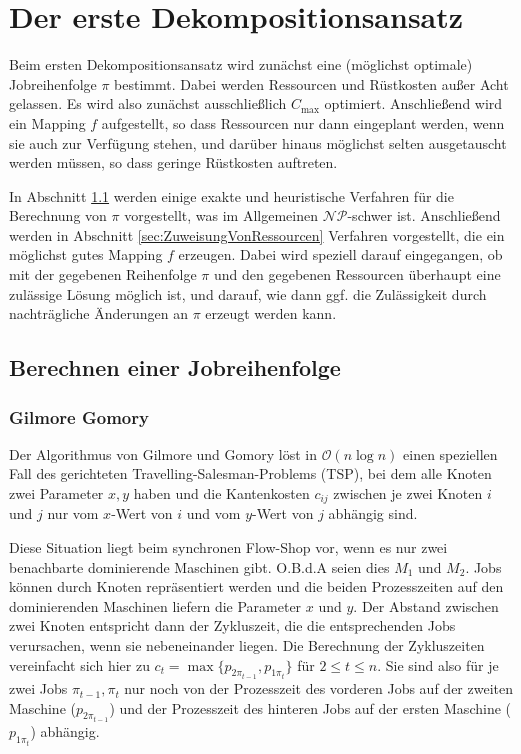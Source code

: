 \documentclass{scrreprt}
\begin{document}
\chapter{Der erste Dekompositionsansatz}
Beim ersten Dekompositionsansatz wird zunächst eine (möglichst optimale) Jobreihenfolge $\pi$ bestimmt.
Dabei werden Ressourcen und Rüstkosten außer Acht gelassen. 
Es wird also zunächst ausschließlich $C_{\max}$ optimiert. Anschließend wird ein Mapping $f$ aufgestellt,
so dass Ressourcen nur dann eingeplant werden, wenn sie auch zur Verfügung stehen, und darüber hinaus
möglichst selten ausgetauscht werden müssen, so dass geringe Rüstkosten auftreten.

In Abschnitt \ref{sec:BerechnenEinerJobreihenfolge} werden einige exakte und heuristische Verfahren für die
Berechnung von $\pi$ vorgestellt, was im Allgemeinen $\mathcal{NP}$-schwer ist.
Anschließend werden in Abschnitt \ref{sec:ZuweisungVonRessourcen} Verfahren vorgestellt, die ein möglichst gutes Mapping $f$ erzeugen.
Dabei wird speziell darauf eingegangen, ob mit der gegebenen Reihenfolge $\pi$ und den gegebenen Ressourcen
überhaupt eine zulässige Lösung möglich ist, und darauf, wie dann ggf. die Zulässigkeit durch nachträgliche Änderungen an $\pi$
erzeugt werden kann.

\section{Berechnen einer Jobreihenfolge}
\label{sec:BerechnenEinerJobreihenfolge}
\subsection{Gilmore Gomory}
Der Algorithmus von Gilmore und Gomory \cite{...} löst in $\mathcal{O}(n\log n)$ einen speziellen Fall des gerichteten Travelling-Salesman-Problems (TSP),
bei dem alle Knoten zwei Parameter $x,y$ haben und die Kantenkosten $c_{ij}$ zwischen je zwei Knoten $i$ und $j$ nur vom $x$-Wert von $i$
und vom $y$-Wert von $j$ abhängig sind.

Diese Situation liegt beim synchronen Flow-Shop vor, wenn es nur zwei benachbarte dominierende Maschinen gibt.
O.B.d.A seien dies $M_1$ und $M_2$.
Jobs können durch Knoten repräsentiert werden und die beiden Prozesszeiten auf den dominierenden Maschinen liefern die Parameter $x$ und $y$. 
Der Abstand zwischen zwei Knoten entspricht dann der Zykluszeit, die die entsprechenden Jobs verursachen, wenn sie nebeneinander liegen.
Die Berechnung der Zykluszeiten vereinfacht sich hier zu
$c_t = \max \{p_{2\pi_{t-1}},p_{1\pi_t}\}$ für $2\leq t\leq n$.
Sie sind also für je zwei Jobs $\pi_{t-1},\pi_{t}$ nur noch von der Prozesszeit des vorderen Jobs auf der zweiten Maschine ($p_{2\pi_{t-1}}$) 
und der Prozesszeit des hinteren Jobs auf der ersten Maschine ($p_{1\pi_t}$) abhängig.
\end{document}
